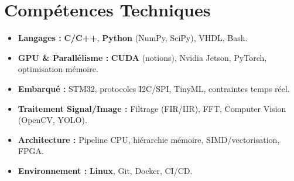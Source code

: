 \documentclass[a4paper,11pt]{article}
\begin{document}
\section{Compétences Techniques}
\begin{itemize}[leftmargin=*, nosep]
    \item \small{\textbf{Langages :} \textbf{C/C++}, \textbf{Python} (NumPy, SciPy), VHDL, Bash.}
    \item \small{\textbf{GPU \& Parallélisme :} \textbf{CUDA} (notions), Nvidia Jetson, PyTorch, optimisation mémoire.}
    \item \small{\textbf{Embarqué :} STM32, protocoles I2C/SPI, TinyML, contraintes temps réel.}
    \item \small{\textbf{Traitement Signal/Image :} Filtrage (FIR/IIR), FFT, Computer Vision (OpenCV, YOLO).}
    \item \small{\textbf{Architecture :} Pipeline CPU, hiérarchie mémoire, SIMD/vectorisation, FPGA.}
    \item \small{\textbf{Environnement :} \textbf{Linux}, Git, Docker, CI/CD.}
\end{itemize}

\end{document}
